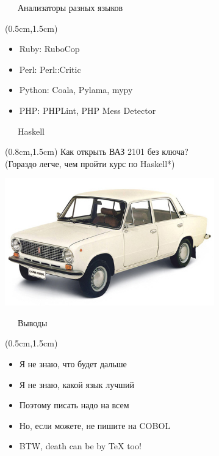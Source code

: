 \documentclass[xetex,18pt,aspectratio=43]{beamer}
\begin{document}
\begin{Large}
\begin{frame}{\ \ \ Анализаторы разных языков}
\begin{textblock*}{\framewidth-0.8cm}(0.5cm,1.5cm)
\begin{itemize}
  \item Ruby: RuboCop
  \item Perl: Perl::Critic
  \item Python: Coala, Pylama, mypy
  \item PHP: PHPLint, PHP Mess Detector
\end{itemize}
\end{textblock*}
\end{frame}

\begin{frame}{\ \ \ Haskell}
\begin{textblock*}{\framewidth}(0.8cm,1.5cm)
Как открыть ВАЗ 2101 без ключа?\\
{\small (Гораздо легче, чем пройти курс по Haskell*)}
\begin{minipage}{\textwidth}
  \centering
  \includegraphics[height=5.5cm]{img/lada_2101_1.jpg}
\end{minipage}
\end{textblock*}
\end{frame}

\begin{frame}{\ \ \ Выводы}
\begin{textblock*}{\framewidth-0.8cm}(0.5cm,1.5cm)
\begin{itemize}
  \item Я не знаю, что будет дальше
  \item Я не знаю, какой язык лучший
  \item Поэтому писать надо на всем
  \item Но, если можете, не пишите на COBOL
  \item BTW, death can be by {\TeX} too!
\end{itemize}
\end{textblock*}
\end{frame}


\end{Large}
\end{document}
